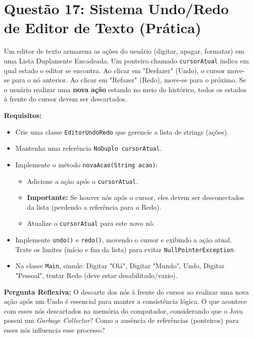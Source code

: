 \documentclass[12pt, a4paper]{article}
\begin{document}
\section*{Questão 17: Sistema Undo/Redo de Editor de Texto (Prática)}
Um editor de texto armazena as ações do usuário (digitar, apagar, formatar) em uma Lista Duplamente Encadeada. Um ponteiro chamado \texttt{cursorAtual} indica em qual estado o editor se encontra. Ao clicar em "Desfazer" (Undo), o cursor move-se para o nó anterior. Ao clicar em "Refazer" (Redo), move-se para o próximo. Se o usuário realizar uma \textbf{nova ação} estando no meio do histórico, todos os estados à frente do cursor devem ser descartados.

\textbf{Requisitos:}
\begin{itemize}
    \item Crie uma classe \texttt{EditorUndoRedo} que gerencie a lista de strings (ações).
    \item Mantenha uma referência \texttt{NoDuplo cursorAtual}.
    \item Implemente o método \texttt{novaAcao(String acao)}:
    \begin{itemize}
        \item Adicione a ação após o \texttt{cursorAtual}.
        \item \textbf{Importante:} Se houver nós após o cursor, eles devem ser desconectados da lista (perdendo a referência para o Redo).
        \item Atualize o \texttt{cursorAtual} para este novo nó.
    \end{itemize}
    \item Implemente \texttt{undo()} e \texttt{redo()}, movendo o cursor e exibindo a ação atual. Trate os limites (início e fim da lista) para evitar \texttt{NullPointerException}.
    \item Na classe \texttt{Main}, simule: Digitar "Olá", Digitar "Mundo", Undo, Digitar "Pessoal", tentar Redo (deve estar desabilitado/vazio).
\end{itemize}

\textbf{Pergunta Reflexiva:} O descarte dos nós à frente do cursor ao realizar uma nova ação após um Undo é essencial para manter a consistência lógica. O que acontece com esses nós descartados na memória do computador, considerando que o Java possui um \textit{Garbage Collector}? Como a ausência de referências (ponteiros) para esses nós influencia esse processo?

\vspace{0.2cm}
\end{document}
